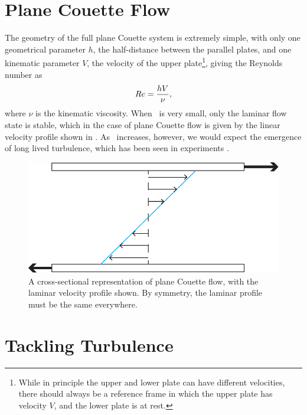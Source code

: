\section{Plane Couette Flow} 

The geometry of the full plane Couette system is extremely simple, with only one geometrical parameter $h$, the half-distance between the parallel plates, and one kinematic parameter $V$, the velocity of the upper plate\footnote{While in principle the upper and lower plate can have different velocities, there should always be a reference frame in which the upper plate has velocity $V$, and the lower plate is at rest.}, giving the Reynolds number as 
\begin{equation}
Re = \dfrac{hV}{\nu},
\end{equation}
where $\nu$ is the kinematic viscosity. When \ReN~is very small, only the laminar flow state is stable, which in the case of plane Couette flow is given by the linear velocity profile shown in . As \ReN~increases, however, we would expect the emergence of long lived turbulence, which has been seen in experiments .
\begin{figure}
\centerline{
\includegraphics[scale=0.6]{Figs/planeCouetteMeanFlow}}
\caption{A cross-sectional representation of plane Couette flow, with the laminar velocity profile shown. By symmetry, the laminar profile must be the same everywhere.}\label{fig:planeCouetteBulk}
\end{figure}

\section{Tackling Turbulence} 

